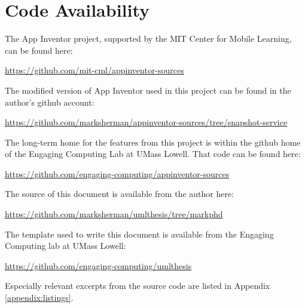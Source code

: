 




% 
% 


\chapter{Code Availability}

\noindent The App Inventor project, supported by the MIT Center for Mobile Learning, can be found here:

\noindent \url{https://github.com/mit-cml/appinventor-sources}

\noindent The modified version of App Inventor used in this project can be found in the author's github account:

\noindent \url{https://github.com/marksherman/appinventor-sources/tree/snapshot-service}

\noindent The long-term home for the features from this project is within the github home of the Engaging Computing Lab at UMass Lowell. That code can be found here:

\noindent \url{https://github.com/engaging-computing/appinventor-sources}

\noindent The source of this document is available from the author here:

\noindent \url{https://github.com/marksherman/umlthesis/tree/markphd}

\noindent The template used to write this document is available from the Engaging Computing lab at UMass Lowell:

\noindent \url{https://github.com/engaging-computing/umlthesis}

\noindent Especially relevant excerpts from the source code are listed in Appendix \ref{appendix:listings}.


